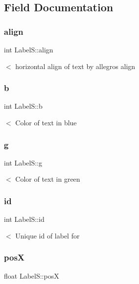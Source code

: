 \subsection{Field Documentation}
\mbox{\label{struct_label_s_a23670dd511cf9261523c08a472e6c448}} 
\subsubsection{\texorpdfstring{align}{align}}
{\footnotesize\ttfamily int Label\+S\+::align}

$<$ horizontal align of text by allegro\textquotesingle{}s align \mbox{\label{struct_label_s_a48147387bcc95eb2ac7e2077b5f5cb2d}} 
\subsubsection{\texorpdfstring{b}{b}}
{\footnotesize\ttfamily int Label\+S\+::b}

$<$ Color of text in blue \mbox{\label{struct_label_s_aa937d6bf5233c68610a5dab7568ec567}} 
\subsubsection{\texorpdfstring{g}{g}}
{\footnotesize\ttfamily int Label\+S\+::g}

$<$ Color of text in green \mbox{\label{struct_label_s_a14bef17a433991b2fa46300033771f5e}} 
\subsubsection{\texorpdfstring{id}{id}}
{\footnotesize\ttfamily int Label\+S\+::id}

$<$ Unique id of label for \mbox{\label{struct_label_s_abd374e9a8cae5f46bd85c17606dbbcc4}} 
\subsubsection{\texorpdfstring{posX}{posX}}
{\footnotesize\ttfamily float Label\+S\+::posX}

